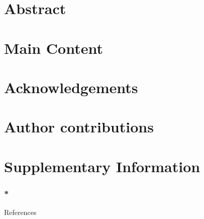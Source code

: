 \documentclass[9pt, twocolumn, lineno]{templates/pi/pi-article}
\begin{document}


\section{Abstract}


\section{Main Content}


\section*{Acknowledgements}


\section*{Author contributions}


\section{Supplementary Information}
\newcommand{\oldsection}[1]{\section{#1}}
\renewcommand{\section}[1]{\subsection{#1}}
\renewcommand{\subsection}[1]{\subsubsection{#1}}


\section*{References}


\end{document}
